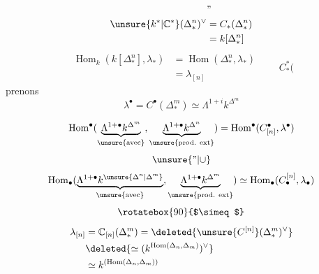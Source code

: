 

\[
\begin{aligned}
&\text{''}\\
\unsure{k^*|\mathbb C^*}(\Delta_*^n)^\vee
&=C_*(\Delta_*^n)\\
&=k[\Delta_*^n]
\end{aligned}
\]
\[
\begin{aligned}
\operatorname{Hom}_k(k[\Delta_*^n],\lambda_*)&=\operatorname{Hom}(\Delta_*^n,\lambda_*)\\
&=\lambda_{[n]}
\end{aligned}
\qquad C_*^*(
\]
prenons
\[
\lambda^\bullet=C^\bullet(\Delta_*^m)\simeq\Lambda^{1+i}k^{\Delta^m}
\]

\[
\operatorname{Hom}^\bullet(
\underbrace{\Lambda^{1+\bullet}k^{\Delta^m}}_{\unsure{\text{avec}}},
\underbrace{\Lambda^{1+\bullet}k^{\Delta^n}}_{\unsure{\text{prod. ext}}})
=\operatorname{Hom}^\bullet(C_{[n]}^\bullet,\lambda^\bullet)
\]
\[
\unsure{\text{''}|\cup}
\]
\[
\operatorname{Hom}_\bullet(
\underbrace{\Lambda^{1+\bullet}k^{\unsure{\Delta^n|\Delta^m}}}_{\unsure{\text{avec}}},
\underbrace{\Lambda^{1+\bullet}k^{\Delta^m}}_{\unsure{\text{prod. ext}}})
\simeq\operatorname{Hom}_\bullet(C_\bullet^{[n]},\lambda_\bullet)
\]
\[
\rotatebox{90}{$\simeq$}
\]
\[
\begin{aligned}
\lambda_{[n]}&=\mathbb C_{[n]}(\Delta_*^m)
=\deleted{\unsure{C^{[n]}}(\Delta_*^m)^\vee}\\
&\deleted{\simeq(k^{\operatorname{Hom}(\Delta_n,\Delta_m)})^\vee}\\
&\simeq k^{(\operatorname{Hom}(\Delta_n,\Delta_m))}
\end{aligned}
\]

